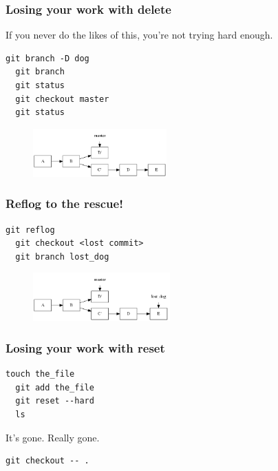 \documentclass{beamer}
\begin{document}
\begin{frame}[fragile]
\frametitle{Losing your work with delete}

If you never do the likes of this, you're not trying hard enough.

\vspace{1em}

\begin{lstlisting}[frame=single]
  git branch -D dog
  git branch
  git status
  git checkout master
  git status
\end{lstlisting}

\vspace{1em}

\begin{figure}[p]
  \centering
  \includegraphics[height=5em]{gone.png}
\end{figure}

\end{frame}

\begin{frame}[fragile]
\frametitle{Reflog to the rescue!}

\vspace{1em}

\begin{lstlisting}[frame=single]
  git reflog
  git checkout <lost commit>
  git branch lost_dog
\end{lstlisting}

\vspace{1em}

\begin{figure}[p]
  \centering
  \includegraphics[height=5em]{returned.png}
\end{figure}

\end{frame}

\begin{frame}[fragile]
\frametitle{Losing your work with reset}

\begin{lstlisting}[frame=single]
  touch the_file
  git add the_file
  git reset --hard
  ls
\end{lstlisting}

\vspace{1em}

It's gone. Really gone.

\vspace{1em}

\begin{lstlisting}[frame=single]
  git checkout -- .
\end{lstlisting}

\end{frame}
\end{document}
